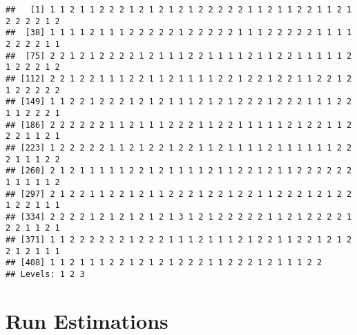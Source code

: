 \documentclass[
]{article}
\newenvironment{Shaded}{\begin{snugshade}}{\end{snugshade}}
\newcommand{\DecValTok}[1]{\textcolor[rgb]{0.00,0.00,0.81}{#1}}
\newcommand{\FunctionTok}[1]{\textcolor[rgb]{0.00,0.00,0.00}{#1}}
\newcommand{\NormalTok}[1]{#1}
\newcommand{\OtherTok}[1]{\textcolor[rgb]{0.56,0.35,0.01}{#1}}
\newcommand{\SpecialCharTok}[1]{\textcolor[rgb]{0.00,0.00,0.00}{#1}}
\newcommand{\StringTok}[1]{\textcolor[rgb]{0.31,0.60,0.02}{#1}}
\begin{document}
\begin{verbatim}
##   [1] 1 1 2 1 1 2 2 2 1 2 1 2 1 2 1 2 2 2 2 2 1 1 2 1 1 2 2 1 1 2 1 2 2 2 2 1 2
##  [38] 1 1 1 1 2 1 1 1 2 2 2 2 2 1 2 2 2 2 2 1 1 1 2 2 2 2 2 1 1 1 1 2 2 2 2 1 1
##  [75] 2 2 1 2 1 2 2 2 2 1 2 1 1 1 2 2 1 1 1 1 2 1 1 2 2 1 1 1 1 1 2 1 2 2 2 1 2
## [112] 2 2 1 2 2 1 1 1 2 2 1 1 2 1 1 1 1 2 2 1 2 2 1 2 2 1 1 2 2 1 2 1 2 2 2 2 2
## [149] 1 1 2 2 1 2 2 2 1 2 1 2 1 1 1 2 1 2 1 2 2 2 1 2 2 2 1 1 1 2 2 1 1 2 2 2 1
## [186] 2 2 2 2 2 2 1 1 2 1 1 1 2 2 2 1 1 2 2 1 1 1 1 1 2 1 2 2 1 1 2 2 2 1 1 2 1
## [223] 1 2 2 2 2 2 1 1 2 1 2 2 1 2 2 1 1 2 1 1 1 1 2 1 1 1 1 1 1 2 2 2 1 1 1 2 2
## [260] 2 1 2 1 1 1 1 1 2 2 1 2 1 1 1 1 2 1 1 2 2 1 2 1 1 2 2 2 2 2 2 1 1 1 1 1 2
## [297] 2 1 2 2 1 1 2 2 1 2 1 1 2 2 2 1 2 2 1 2 2 1 1 2 2 2 1 2 1 2 2 1 2 2 1 1 1
## [334] 2 2 2 2 1 2 1 2 1 2 1 2 1 3 1 2 1 2 2 2 2 2 1 1 2 1 2 2 2 2 1 2 2 1 1 2 1
## [371] 1 1 2 2 2 2 2 2 1 2 2 2 1 1 1 2 1 1 1 2 1 2 2 1 1 2 2 1 2 1 2 2 1 2 1 1 1
## [408] 1 1 2 1 1 1 2 2 1 2 1 2 1 2 2 2 1 1 2 2 2 1 2 1 1 1 2 2
## Levels: 1 2 3
\end{verbatim}

\begin{Shaded}
\end{Shaded}

\hypertarget{run-estimations}{%
\section{Run Estimations}\label{run-estimations}}
\end{document}
